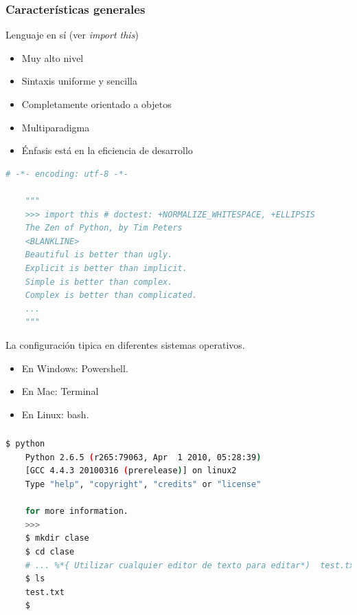 \documentclass[]{beamer}
\begin{document}
\begin{frame}[fragile]
	\frametitle{Características generales}
	
	\begin{block}{Lenguaje en sí (ver \emph{import this})}
		\begin{itemize}
			\item Muy alto nivel
			\item Sintaxis uniforme y sencilla
			\item Completamente orientado a objetos
			\item Multiparadigma
			\item Énfasis está en la eficiencia de desarrollo
		\end{itemize}
	\end{block}
	\begin{lstlisting}[language=Python,inputencoding=utf8, 
	basicstyle=\ttfamily\small, 
	keywordstyle=\color{keywords},
	commentstyle=\color{comments},
	stringstyle=\color{red},
	showstringspaces=false,
	identifierstyle=\color{green}, basicstyle=\tiny]
	# -*- encoding: utf-8 -*-
	
	"""
	>>> import this # doctest: +NORMALIZE_WHITESPACE, +ELLIPSIS
	The Zen of Python, by Tim Peters
	<BLANKLINE>
	Beautiful is better than ugly.
	Explicit is better than implicit.
	Simple is better than complex.
	Complex is better than complicated.
	...
	"""
	\end{lstlisting}
\end{frame}

\begin{frame}{La configuración tipica en diferentes sistemas operativos.}
	\begin{itemize}
		\item En Windows: \alert{Powershell.}
		\item En Mac: \alert{Terminal}
		\item En Linux: \alert{bash.}
	\end{itemize}
\end{frame}

\begin{frame}[fragile]
	\frametitle{}
	
	\begin{lstlisting}[language=bash,caption=Bash y Revision de Python]
	$ python
	Python 2.6.5 (r265:79063, Apr  1 2010, 05:28:39)
	[GCC 4.4.3 20100316 (prerelease)] on linux2
	Type "help", "copyright", "credits" or "license"
	
	for more information.
	>>>
	$ mkdir clase
	$ cd clase
	# ... %*{ Utilizar cualquier editor de texto para editar*)  test.txt
	$ ls
	test.txt
	$
	\end{lstlisting}
\end{frame}
\end{document}
